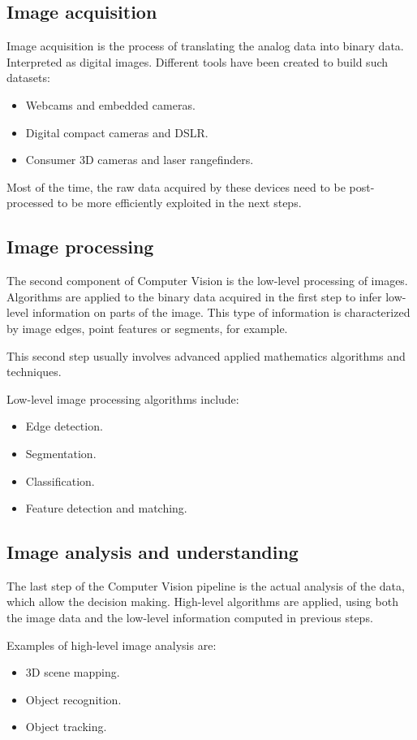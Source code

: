 \subsection{Image acquisition}
Image acquisition is the process of translating the analog data into binary data. Interpreted as digital images.
Different tools have been created to build such datasets:
\begin{itemize}
    \item Webcams and embedded cameras.
    \item Digital compact cameras and DSLR.
    \item Consumer 3D cameras and laser rangefinders.
\end{itemize}
Most of the time, the raw data acquired by these devices need to be post-processed to be more efficiently exploited in the next steps.

\subsection{Image processing}
The second component of Computer Vision is the low-level processing of images. Algorithms are applied to the binary data acquired in the first step to infer low-level information on parts of the image. This type of information is characterized by image edges, point features or segments, for example.

This second step usually involves advanced applied mathematics algorithms and techniques.

Low-level image processing algorithms include:
\begin{itemize}
    \item Edge detection.
    \item Segmentation.
    \item Classification.
    \item Feature detection and matching.
\end{itemize}

\subsection{Image analysis and understanding}
The last step of the Computer Vision pipeline is the actual analysis of the data, which allow the decision making.
High-level algorithms are applied, using both the image data and the low-level information computed in previous steps.

Examples of high-level image analysis are:
\begin{itemize}
    \item 3D scene mapping.
    \item Object recognition.
    \item Object tracking.
\end{itemize}
